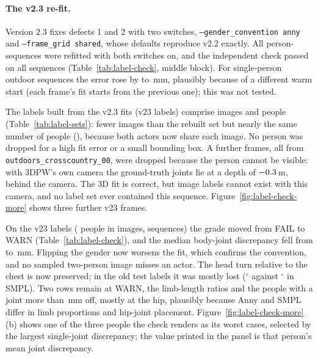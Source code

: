 \paragraph{The v2.3 re-fit.} Version 2.3 fixes defects 1 and 2 with two switches, \texttt{--gender\_convention anny}
and \texttt{--frame\_grid shared}, whose defaults reproduce v2.2 exactly. All \DataThreeDPWPersonSeq{}
person-sequences were refitted with both switches on, and the independent check passed on all \DataRefitSeq{}
sequences (Table~\ref{tab:label-check}, middle block). For \DataRefitWorseSeq{} single-person outdoor sequences the
error rose by \DataRefitWorseMin{} to \DataRefitWorseMax\,mm, plausibly because of a different warm start (each frame's fit
starts from the previous one); this was not tested.

The labels built from the v2.3 fits (v23 labels) comprise \DataThreeDPWTotalImages{} images and
\DataThreeDPWTotalPeople{} people (Table~\ref{tab:label-sets}): fewer images than the rebuilt set but nearly the same
number of people (\DataRebuiltTotalPeople), because both actors now share each image. No person was dropped for a high
fit error or a small bounding box. A further \DataCrossCountryFramesNew{} frames, all from
\texttt{outdoors\_crosscountry\_00}, were dropped because the person cannot be visible: with 3DPW's own camera the ground-truth joints lie at a depth of
$-0.3$\,m, behind the camera. The 3D fit is correct, but image labels cannot exist with this camera,
and no label set ever contained this sequence. Figure~\ref{fig:label-check-more} shows three further v23 frames.

On the v23 labels (\DataCheckPeople{} people in \DataCheckImages{} images, \DataCheckSeq{} sequences) the grade moved
from FAIL to WARN (Table~\ref{tab:label-check}), and the median body-joint discrepancy fell from
\DataCheckJointsOld{} to \DataCheckJointsNew\,mm. Flipping the gender now worsens the fit, which confirms the
convention, and no sampled two-person image misses an actor. The head turn relative to the chest is now preserved; in
the old test labels it was mostly lost (\DataCheckHeadTestLabelOld$^\circ$ against \DataCheckHeadTestSmplOld$^\circ$
in SMPL). Two rows remain at WARN, the limb-length ratios and the people with a joint more than \DataCheckFarMm\,mm
off, mostly at the hip, plausibly because Anny and SMPL differ in limb proportions and hip-joint placement.
Figure~\ref{fig:label-check-more}(b) shows one of the three people the check renders as its worst cases, selected by
the largest single-joint discrepancy; the value printed in the panel is that person's mean joint discrepancy.

